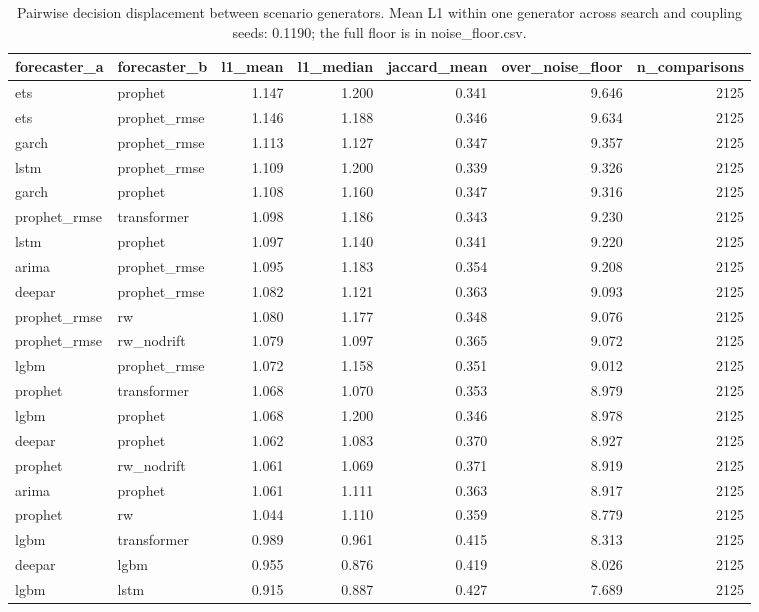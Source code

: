 \begin{table}
\caption{Pairwise decision displacement between scenario generators. Mean L1 within one generator across search and coupling seeds: 0.1190; the full floor is in noise_floor.csv.}
\label{tab:displacement_between}
\begin{tabular}{llrrrrr}
\toprule
forecaster\_a & forecaster\_b & l1\_mean & l1\_median & jaccard\_mean & over\_noise\_floor & n\_comparisons \\
\midrule
ets & prophet & 1.147 & 1.200 & 0.341 & 9.646 & 2125 \\
ets & prophet\_rmse & 1.146 & 1.188 & 0.346 & 9.634 & 2125 \\
garch & prophet\_rmse & 1.113 & 1.127 & 0.347 & 9.357 & 2125 \\
lstm & prophet\_rmse & 1.109 & 1.200 & 0.339 & 9.326 & 2125 \\
garch & prophet & 1.108 & 1.160 & 0.347 & 9.316 & 2125 \\
prophet\_rmse & transformer & 1.098 & 1.186 & 0.343 & 9.230 & 2125 \\
lstm & prophet & 1.097 & 1.140 & 0.341 & 9.220 & 2125 \\
arima & prophet\_rmse & 1.095 & 1.183 & 0.354 & 9.208 & 2125 \\
deepar & prophet\_rmse & 1.082 & 1.121 & 0.363 & 9.093 & 2125 \\
prophet\_rmse & rw & 1.080 & 1.177 & 0.348 & 9.076 & 2125 \\
prophet\_rmse & rw\_nodrift & 1.079 & 1.097 & 0.365 & 9.072 & 2125 \\
lgbm & prophet\_rmse & 1.072 & 1.158 & 0.351 & 9.012 & 2125 \\
prophet & transformer & 1.068 & 1.070 & 0.353 & 8.979 & 2125 \\
lgbm & prophet & 1.068 & 1.200 & 0.346 & 8.978 & 2125 \\
deepar & prophet & 1.062 & 1.083 & 0.370 & 8.927 & 2125 \\
prophet & rw\_nodrift & 1.061 & 1.069 & 0.371 & 8.919 & 2125 \\
arima & prophet & 1.061 & 1.111 & 0.363 & 8.917 & 2125 \\
prophet & rw & 1.044 & 1.110 & 0.359 & 8.779 & 2125 \\
lgbm & transformer & 0.989 & 0.961 & 0.415 & 8.313 & 2125 \\
deepar & lgbm & 0.955 & 0.876 & 0.419 & 8.026 & 2125 \\
lgbm & lstm & 0.915 & 0.887 & 0.427 & 7.689 & 2125 \\

\end{tabular}
\end{table}
